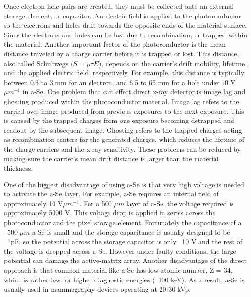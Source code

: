 Once electron-hole pairs are created, they must be collected onto an external storage element, or capacitor.  An electric field is applied to the photoconductor so the electrons and holes drift towards the opposite ends of the material surface.  Since the electrons and holes can be lost due to recombination, or trapped within the material.  Another important factor of the photoconductor is the mean distance traveled by a charge carrier before it is trapped or lost.  This distance, also called Schubwegs ($S = \mu \tau E$), depends on the carrier's drift mobility, lifetime, and the applied electric field, respectively.  For example, this distance is typically between 0.3 to 3 mm for an electron, and 6.5 to 65 mm for a hole under 10 V$\mu m^{-1}$ in a-Se.  One problem that can effect direct x-ray detector is image lag and ghosting produced within the photoconductor material.  Image lag refers to the carried-over image produced from previous exposures to the next exposure.  This is caused by the trapped charges from one exposure becoming detrapped and readout by the subsequent image.  Ghosting refers to the trapped charges acting as recombination centers for the generated charges, which reduces the lifetime of the charge carriers and the x-ray sensitivity.  These problems can be reduced by making sure the carrier's mean drift distance is larger than the material thickness.

One of the biggest disadvantage of using a-Se is that very high voltage is needed to activate the a-Se layer.  For example, a-Se requires an internal field of approximately 10 V$\mu m^{-1}$.  For a 500 $\mu m$ layer of a-Se, the voltage required is approximately 5000 V.  This voltage drop is applied in series across the photoconductor and the pixel storage element.  Fortunately the capacitance of a ~500 $\mu m$ a-Se is small and the storage capacitance is usually designed to be ~1pF, so the potential across the storage capacitor is only ~10 V and the rest of the voltage is dropped across a-Se.  However under faulty conditions, the large potential can damage the active-matrix array.  Another disadvantage of the direct approach is that common material like a-Se has low atomic number, Z = 34, which is rather low for higher diagnostic energies (~100 keV).  As a result, a-Se is usually used in mammography devices operating at 20-30 kVp.  
%
%  
%
